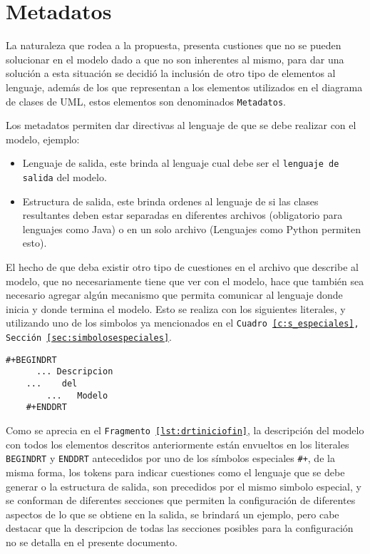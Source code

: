\section{Metadatos}
\label{sec:metadatos}

La naturaleza que rodea a la propuesta, presenta custiones que no se pueden
solucionar en el modelo dado a que no son inherentes al mismo, para dar una
solución a esta situación se decidió la inclusión de otro tipo de elementos al
lenguaje, además de los que representan a los elementos utilizados en el
diagrama de clases de UML, estos elementos son denominados \texttt{Metadatos}.

Los metadatos permiten dar directivas al lenguaje de que se debe realizar con
el modelo, ejemplo:

\begin{itemize}
\item Lenguaje de salida, este brinda al lenguaje cual debe ser el
\texttt{lenguaje de salida} del modelo.
\item Estructura de salida, este brinda ordenes al lenguaje de si las clases
resultantes deben estar separadas en diferentes archivos (obligatorio para
lenguajes como Java) o en un solo archivo (Lenguajes como Python permiten
esto).
\end{itemize}

El hecho de que deba existir otro tipo de cuestiones en el archivo que describe
al modelo, que no necesariamente tiene que ver con el modelo, hace que también
sea necesario agregar algún mecanismo que permita comunicar al lenguaje donde
inicia y donde termina el modelo. Esto se realiza con los siguientes literales,
y utilizando uno de los simbolos ya mencionados en el \texttt{Cuadro
\ref{c:s_especiales}, Sección {\ref{sec:simbolosespeciales}}}.

\begin{lstlisting}[caption={Director - Inicio y Fin del Modelo},
label=lst:drtiniciofin]
	#+BEGINDRT
	  ... Descripcion
    ...    del
		...   Modelo
	#+ENDDRT
\end{lstlisting}

Como se aprecia en el \texttt{Fragmento {\ref{lst:drtiniciofin}}}, la descripción
del modelo con todos los elementos descritos anteriormente están envueltos
en los literales \texttt{BEGINDRT} y \texttt{ENDDRT} antecedidos por uno de los
símbolos especiales \texttt{\#+}, de la misma forma, los tokens para indicar
cuestiones como el lenguaje que se debe generar o la estructura de salida,
son precedidos por el mismo simbolo especial, y se conforman de diferentes
secciones que permiten la configuración de diferentes aspectos de lo que se
obtiene en la salida, se brindará un ejemplo, pero cabe destacar que la
descripcion de todas las secciones posibles para la configuración no se detalla
en el presente documento.

